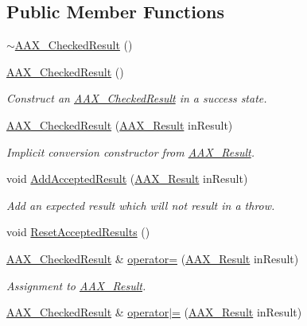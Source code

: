 \subsection*{Public Member Functions}
\begin{DoxyCompactItemize}
\item 
\mbox{\hyperlink{a01601_ac8120ba01d2f25608d74533c9d1a9747}{$\sim$\+A\+A\+X\+\_\+\+Checked\+Result}} ()
\item 
\mbox{\hyperlink{a01601_aab8a1c36b9be4f6aac93d79d3160dde8}{A\+A\+X\+\_\+\+Checked\+Result}} ()
\begin{DoxyCompactList}\small\item\em Construct an \mbox{\hyperlink{a01601}{A\+A\+X\+\_\+\+Checked\+Result}} in a success state. \end{DoxyCompactList}\item 
\mbox{\hyperlink{a01601_a03a1d64b0bf359b6a23ae59f6d892859}{A\+A\+X\+\_\+\+Checked\+Result}} (\mbox{\hyperlink{a00392_a4d8f69a697df7f70c3a8e9b8ee130d2f}{A\+A\+X\+\_\+\+Result}} in\+Result)
\begin{DoxyCompactList}\small\item\em Implicit conversion constructor from \mbox{\hyperlink{a00392_a4d8f69a697df7f70c3a8e9b8ee130d2f}{A\+A\+X\+\_\+\+Result}}. \end{DoxyCompactList}\item 
void \mbox{\hyperlink{a01601_af6c4b10c55e959f5f8424514a3cbb68a}{Add\+Accepted\+Result}} (\mbox{\hyperlink{a00392_a4d8f69a697df7f70c3a8e9b8ee130d2f}{A\+A\+X\+\_\+\+Result}} in\+Result)
\begin{DoxyCompactList}\small\item\em Add an expected result which will not result in a throw. \end{DoxyCompactList}\item 
void \mbox{\hyperlink{a01601_a14a7d7cab3e771a38481a7ab5447ea52}{Reset\+Accepted\+Results}} ()
\item 
\mbox{\hyperlink{a01601}{A\+A\+X\+\_\+\+Checked\+Result}} \& \mbox{\hyperlink{a01601_af95bea6f011d9a779170fc6128dc7295}{operator=}} (\mbox{\hyperlink{a00392_a4d8f69a697df7f70c3a8e9b8ee130d2f}{A\+A\+X\+\_\+\+Result}} in\+Result)
\begin{DoxyCompactList}\small\item\em Assignment to \mbox{\hyperlink{a00392_a4d8f69a697df7f70c3a8e9b8ee130d2f}{A\+A\+X\+\_\+\+Result}}. \end{DoxyCompactList}\item 
\mbox{\hyperlink{a01601}{A\+A\+X\+\_\+\+Checked\+Result}} \& \mbox{\hyperlink{a01601_a5be1639dbab20f74265dfad8685e7f9f}{operator$\vert$=}} (\mbox{\hyperlink{a00392_a4d8f69a697df7f70c3a8e9b8ee130d2f}{A\+A\+X\+\_\+\+Result}} in\+Result)

\end{DoxyCompactItemize}
